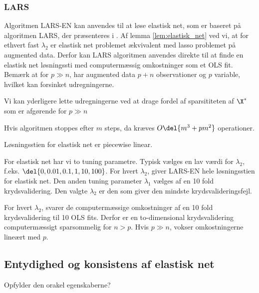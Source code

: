 %


\subsubsection{LARS}
Algoritmen LARS-EN kan anvendes til at løse elastisk net, som er baseret på algoritmen LARS, der præsenteres i \cite{efron}.
Af lemma \ref{lem:elastisk_net} ved vi, at for ethvert fast \(\lambda_2\) er elastisk net problemet ækvivalent med lasso problemet på augmented data.
Derfor kan LARS algoritmen anvendes direkte til at finde en elastisk net løsningssti med computermæssig omkostninger som et OLS fit.
Bemærk at for \(p \gg n\), har augmented data \(p+n\) observationer og \(p\) variable, hvilket kan forsinket udregningerne.

Vi kan yderligere lette udregningerne ved at drage fordel af sparsititeten af \(\X^*\) som er afgørende for \(p \gg n\)

Hvis algoritmen stoppes efter \(m\) steps, da kræves \(O \del{m^3 + pm^2}\) operationer.

Løsningsstien for elastisk net er piecewise linear.

For elastisk net har vi to tuning parametre. 
Typisk vælges en lav værdi for \(\lambda_2\), f.eks. \(\del{0,0.01,0.1,1,10,100}\).
For hvert \(\lambda_2\), giver LARS-EN hele løsningsstien for elastisk net.
Den anden tuning parameter \(\lambda_1\) vælges af en 10 fold krydsvalidering.
Den valgte \(\lambda_2\) er den som giver den mindste krydsvalideringsfejl.

For hvert \(\lambda_2\), svarer de computermæssige omkostninger af en 10 fold krydsvalidering til 10 OLS fits.
Derfor er en to-dimensional krydsvalidering computermæssigt sparsommelig for \(n > p\).
Hvis \(p \gg n\), vokser omkostningerne lineært med \(p\).

\subsection{Entydighed og konsistens af elastisk net}
Opfylder den orakel egenskaberne?
\newpage
